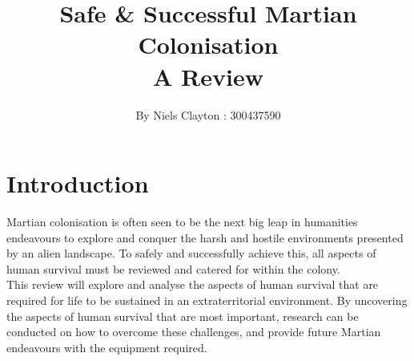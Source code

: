 \documentclass[a4paper,11pt]{article}
\newcommand\tab[1][1cm]{\hspace*{#1}}
\begin{document}
\title{\LARGE{\textbf{Safe \& Successful Martian Colonisation}\\A Review}}
\author{By Niels Clayton : 300437590}
\date{}
\maketitle

\section*{Introduction}
\linenumbers
Martian colonisation is often seen to be the next big leap in humanities endeavours to explore and conquer the harsh and hostile environments presented by an alien landscape. To safely and successfully achieve this, all aspects of human survival must be reviewed and catered for within the colony.\\ 
\tab This review will explore and analyse the aspects of human survival that are required for life to be sustained in an extraterritorial environment. By uncovering the aspects of human survival that are most important, research can be conducted on how to overcome these challenges, and provide future Martian endeavours with the equipment required.
\end{document}
